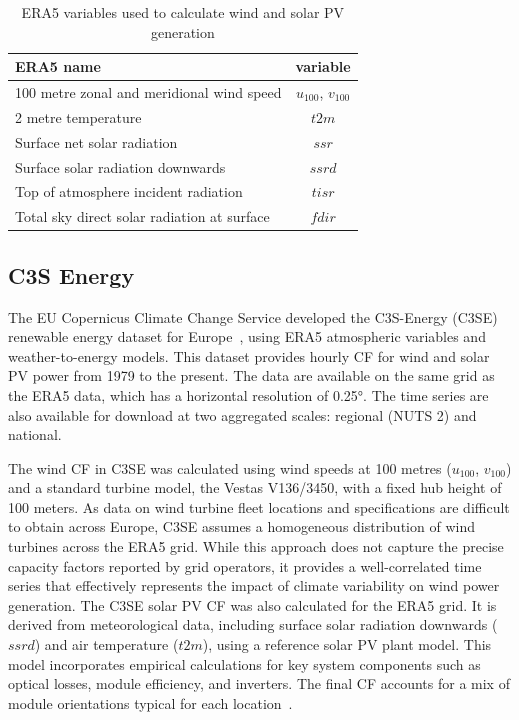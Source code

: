 \documentclass[preprint, 12pt]{elsarticle}
\begin{document}
\begin{table}[h!]
	\centering
	\caption{ERA5 variables used to calculate wind and solar PV generation}
	\begin{tabular}{|l|c|}
		\hline
		{\textbf{ERA5 name}}      & \textbf{variable} \\ \hline
		100 metre zonal and meridional wind speed   & $u_{100}$, $v_{100}$ \\
		2 metre temperature                         & $t2m$ \\
		Surface net solar radiation                 & $ssr$ \\
		Surface solar radiation downwards           & $ssrd$  \\
		Top of atmosphere incident radiation        & $tisr$  \\
		Total sky direct solar radiation at surface & $fdir$  \\ \hline
	\end{tabular}
	\label{tab:var_name}
\end{table}

\subsection{C3S Energy}
\label{sec:c3se}

The EU Copernicus Climate Change Service developed the C3S-Energy (C3SE) renewable energy dataset for Europe~\citep{dubus2023energy}, using ERA5 atmospheric variables and weather-to-energy models. This dataset provides hourly CF for wind and solar PV power from 1979 to the present. The data are available on the same grid as the ERA5 data, which has a horizontal resolution of 0.25°. The time series are also available for download at two aggregated scales: regional (NUTS 2) and national.

The wind CF in C3SE was calculated using wind speeds at 100 metres ($u_{100}$, $v_{100}$) and a standard turbine model, the Vestas V136/3450, with a fixed hub height of 100 meters. As data on wind turbine fleet locations and specifications are difficult to obtain across Europe, C3SE assumes a homogeneous distribution of wind turbines across the ERA5 grid. While this approach does not capture the precise capacity factors reported by grid operators, it provides a well-correlated time series that effectively represents the impact of climate variability on wind power generation. The C3SE solar PV CF was also calculated for the ERA5 grid. It is derived from meteorological data, including surface solar radiation downwards ($ssrd$) and air temperature ($t2m$), using a reference solar PV plant model. This model incorporates empirical calculations for key system components such as optical losses, module efficiency, and inverters. The final CF accounts for a mix of module orientations typical for each location~\citep{saintdrenan2018solar}. 
\end{document}
